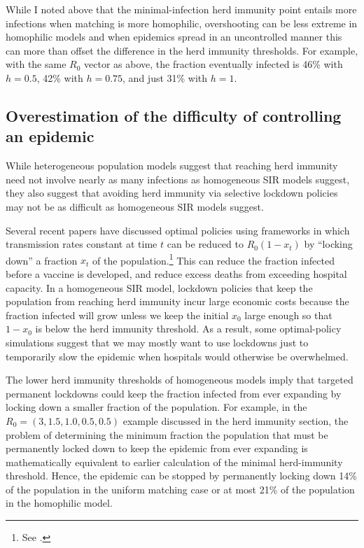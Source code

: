 \documentclass[11pt]{article}
\begin{document}
While I noted above that
the minimal-infection herd immunity point entails more infections when matching is more homophilic, overshooting can be less extreme in homophilic
models and when epidemics spread in an uncontrolled manner this can more than offset the difference in the herd immunity thresholds. For example, with the same $R_0$ vector as above, 
the fraction eventually infected is 46\% with $h = 0.5$, 42\% with $h=0.75$, and just 31\% with $h=1$.

\subsection{Overestimation of the difficulty of controlling an epidemic}

While heterogeneous population models suggest that reaching herd immunity need not involve nearly as many infections as homogeneous SIR
models suggest, they also suggest that avoiding herd immunity via selective lockdown policies may not be as difficult as
homogeneous SIR models suggest. 

Several recent papers have discussed optimal policies using frameworks in which transmission
rates constant at time $t$ can be reduced to $R_0 (1-x_t)$ by ``locking down'' a fraction $x_t$ of the population.\footnote{See \citet{acemoglu2020multi, lippi2020simple, rowthorn2012optimal}.} This can reduce
the fraction infected before a vaccine is developed, and reduce excess deaths from exceeding hospital capacity. In a homogeneous
SIR model, lockdown policies that keep the population from reaching herd immunity incur large economic costs because the fraction infected will grow 
unless we keep the initial $x_0$ large enough so that $1 - x_0$ is below the herd immunity threshold. As a result, some  optimal-policy simulations suggest
that we may mostly want to use lockdowns just to temporarily slow the epidemic when hospitals would otherwise be overwhelmed.

The lower herd immunity thresholds of homogeneous models imply that targeted permanent lockdowns could keep the fraction infected 
from ever expanding by locking down a smaller fraction of the population. For example, in the $R_0 = (3, 1.5, 1.0, 0.5, 0.5)$ 
example discussed in the herd immunity section, 
the problem of determining the minimum fraction
the population that must be permanently locked
down to keep the epidemic from ever expanding is
mathematically equivalent to earlier calculation of the minimal herd-immunity threshold. Hence, 
the epidemic can be stopped by permanently locking down 14\% of the population in the
uniform matching case or at most 21\% of the population in the homophilic model.
\end{document}

